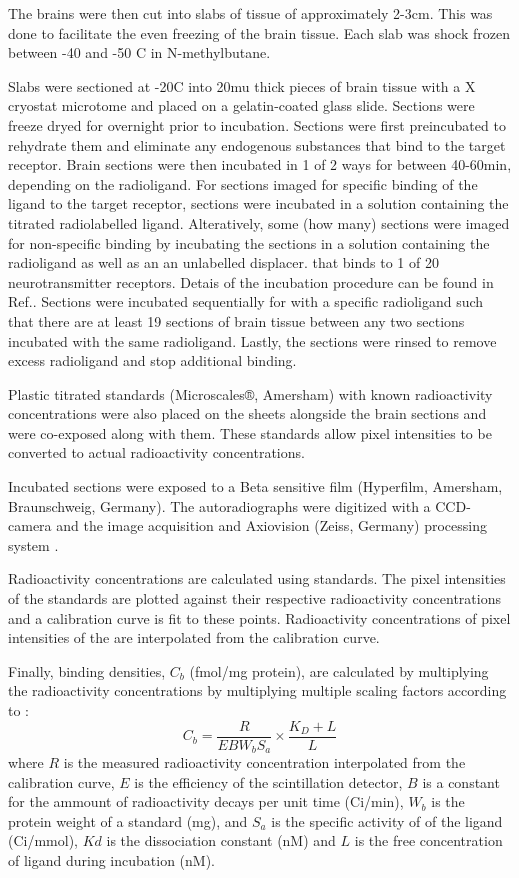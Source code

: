 \documentclass[12pt]{article}
\begin{document}
The brains were then cut into slabs of tissue of approximately 2-3cm. This was done to facilitate the even freezing of the brain tissue. Each slab was shock frozen between -40 and -50 C in N-methylbutane. 

Slabs were sectioned at -20C into 20mu thick pieces of brain tissue with a X cryostat microtome and placed on a gelatin-coated glass slide. Sections were freeze dryed for overnight prior to incubation. Sections were first preincubated to rehydrate them and eliminate any endogenous substances that bind to the target receptor. Brain sections were then incubated in 1 of 2 ways for between 40-60min, depending on the radioligand. For sections imaged for specific binding of the ligand to the target receptor, sections were incubated in a solution containing the titrated radiolabelled ligand. Alteratively, some (how many) sections were imaged for non-specific binding by  incubating the sections in a solution containing the radioligand as well as an an unlabelled displacer.  that binds to 1 of 20 neurotransmitter receptors. Detais of the incubation procedure can be found in Ref.\cite{Zilles2002quantiative}. Sections were incubated sequentially for with a specific radioligand such that there are at least 19 sections of brain tissue between any two sections incubated with the same radioligand. Lastly, the sections were rinsed to remove excess radioligand and stop additional binding.  

Plastic titrated standards (Microscales®, Amersham) with known radioactivity concentrations were also placed on the sheets alongside the brain sections and were co-exposed along with them. These standards allow pixel intensities to be converted to actual radioactivity concentrations.  

Incubated sections were exposed to a Beta sensitive film (Hyperfilm, Amersham, Braunschweig, Germany).  The autoradiographs were digitized with a CCD-camera and the image acquisition and Axiovision (Zeiss, Germany) processing system .

Radioactivity concentrations are calculated using standards. The pixel intensities of the standards are plotted against their respective radioactivity concentrations and a calibration curve is fit to these points. Radioactivity concentrations of pixel intensities of the are interpolated from the calibration curve.

Finally, binding densities, $C_b$ (fmol/mg protein), are calculated by multiplying the radioactivity concentrations by multiplying multiple scaling factors according to :
            \begin{equation}
                C_b = \frac{R}{ E B W_b S_a} \times \frac{K_D + L}{L}
            \end{equation}
where $R$ is the measured radioactivity concentration interpolated from the calibration curve, $E$ is the efficiency of the scintillation detector, $B$ is a constant for the ammount of radioactivity decays per unit time (Ci/min), $W_b$ is the protein weight of a standard (mg), and $S_a$ is the specific activity of of the ligand (Ci/mmol), $Kd$ is the dissociation constant (nM) and $L$ is the free concentration of ligand during incubation (nM).
\end{document}
